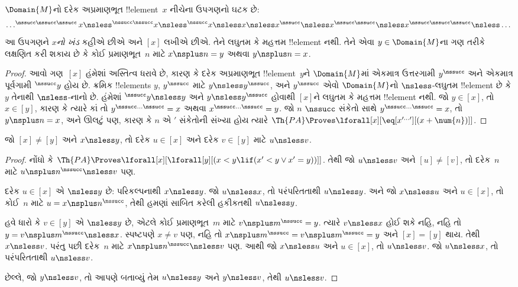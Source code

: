 \documentclass[../../../include/open-logic-section]{subfiles}
\begin{document}
\begin{prop}
$\Domain{M}$નો દરેક અપ્રમાણભૂત !!{element}~$x$ નીચેના ઉપગણનો ઘટક છે:
\[
\dots ^{\nssucc\nssucc\nssucc}x \nsless ^{\nssucc\nssucc}x \nsless
^{\nssucc}x \nsless x \nsless x^{\nssucc} \nsless x^{\nssucc\nssucc}
\nsless x^{\nssucc\nssucc\nssucc} \nsless \dots
\]
આ ઉપગણને \emph{$x$નો ખંડ} કહીએ છીએ અને $[x]$ લખીએ છીએ. તેને લઘુતમ
કે મહત્તમ !!{element} નથી. તેને એવા $y\in\Domain{M}$ના ગણ તરીકે
લક્ષણિત કરી શકાય છે કે કોઈ પ્રમાણભૂત~$n$ માટે
$x\nsplus n=y$ અથવા $y\nsplus n=x$.
\end{prop}

\begin{proof}
આવો ગણ~$[x]$ હંમેશાં અસ્તિત્વ ધરાવે છે, કારણ કે દરેક અપ્રમાણભૂત
!!{element}~$y$ને $\Domain{M}$માં એકમાત્ર ઉત્તરગામી $y^\nssucc$ અને
એકમાત્ર પૂર્વગામી $^\nssucc y$ હોય છે. ક્રમિક !!{element}s $y$,
$y^\nssucc$ માટે
$y\nsless y^\nssucc$, અને $y^\nssucc$ એવો $\Domain{M}$નો
$\nsless$-લઘુતમ !!{element} છે કે $y$ તેનાથી $\nsless$-નાનો છે.
હંમેશાં $^\nssucc y\nsless y$ અને $y\nsless y^\nssucc$ હોવાથી
$[x]$ને લઘુતમ કે મહત્તમ !!{element} નથી. જો $y\in[x]$, તો
$x\in[y]$, કારણ કે ત્યારે કાં તો $y^{\nssucc\dots\nssucc}=x$ અથવા
$x^{\nssucc\dots\nssucc}=y$. જો $n$ $\nssucc$ સંકેતો સાથે
$y^{\nssucc\dots\nssucc}=x$, તો $y\nsplus n=x$, અને ઊલટું પણ,
કારણ કે $n$ એ $\prime$ સંકેતોની સંખ્યા હોય ત્યારે
$\Th{PA}\Proves\lforall[x][\eq[x^{\prime\dots\prime}][(x+\num{n})]]$.
\end{proof}

\begin{prop}
જો $[x]\neq[y]$ અને $x\nsless y$, તો દરેક $u\in[x]$ અને દરેક
$v\in[y]$ માટે $u\nsless v$.
\end{prop}

\begin{proof}
નોંધો કે
$\Th{PA}\Proves\lforall[x][\lforall[y][(x<y\lif(x'<y\lor x'=y))]]$.
તેથી જો $u\nsless v$ અને $[u]\neq[v]$, તો દરેક~$n$ માટે
$u\nsplus n^\nssucc\nsless v$ પણ.

દરેક $u\in[x]$ એ $\nsless y$ છે: પરિકલ્પનાથી $x\nsless y$. જો
$u\nsless x$, તો પરંપરિતતાથી $u\nsless y$. અને જો $x\nsless u$ અને
$u\in[x]$, તો કોઈ~$n$ માટે $u=x\nsplus n^\nssucc$, તેથી હમણાં સાબિત
કરેલી હકીકતથી $u\nsless y$.

હવે ધારો કે $v\in[y]$ એ $\nsless y$ છે, એટલે કોઈ પ્રમાણભૂત~$m$ માટે
$v\nsplus m^\nssucc=y$. ત્યારે $v\nsless x$ હોઈ શકે નહિ, નહિ તો
$y=v\nsplus m^\nssucc\nsless x$. સ્પષ્ટપણે $x\neq v$ પણ, નહિ તો
$x\nsplus m^\nssucc=v\nsplus m^\nssucc=y$ અને $[x]=[y]$ થાય. તેથી
$x\nsless v$. પરંતુ પછી દરેક~$n$ માટે
$x\nsplus n^\nssucc\nsless v$ પણ. આથી જો $x\nsless u$ અને
$u\in[x]$, તો $u\nsless v$. જો $u\nsless x$, તો પરંપરિતતાથી
$u\nsless v$.

છેલ્લે, જો $y\nsless v$, તો આપણે બતાવ્યું તેમ $u\nsless y$ અને
$y\nsless v$, તેથી $u\nsless v$.
\end{proof}
\end{document}
